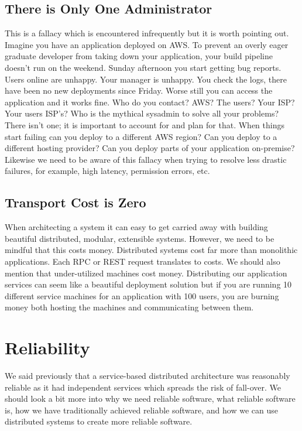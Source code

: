 \subsection{There is Only One Administrator}
This is a fallacy which is encountered infrequently but it is worth pointing out.
Imagine you have an application deployed on AWS.
To prevent an overly eager graduate developer from taking down your application,
your build pipeline doesn't run on the weekend.
Sunday afternoon you start getting bug reports.
Users online are unhappy.
Your manager is unhappy.
You check the logs,
there have been no new deployments since Friday.
Worse still you can access the application and it works fine.
Who do you contact?
AWS? The users? Your ISP? Your users ISP's?
Who is the mythical sysadmin to solve all your problems?
There isn't one; it is important to account for and plan for that.
When things start failing can you deploy to a different AWS region?
Can you deploy to a different hosting provider?
Can you deploy parts of your application on-premise?
Likewise we need to be aware of this fallacy when trying to resolve less drastic failures, for example, high latency, permission errors, etc.

\subsection{Transport Cost is Zero}
When architecting a system it can easy to get carried away with building beautiful distributed, modular, extensible systems.
However, we need to be mindful that this costs money.
Distributed systems cost far more than monolithic applications.
Each RPC or REST request translates to costs.
We should also mention that under-utilized machines cost money.
Distributing our application services can seem like a beautiful deployment solution but if you are running 10 different service machines for an application with 100 users,
you are burning money both hosting the machines and communicating between them. 

\section{Reliability}
We said previously that a service-based distributed architecture was reasonably reliable as it had independent services which spreads the risk of fall-over.
We should look a bit more into why we need reliable software,
what reliable software is,
how we have traditionally achieved reliable software,
and how we can use distributed systems to create more reliable software.

